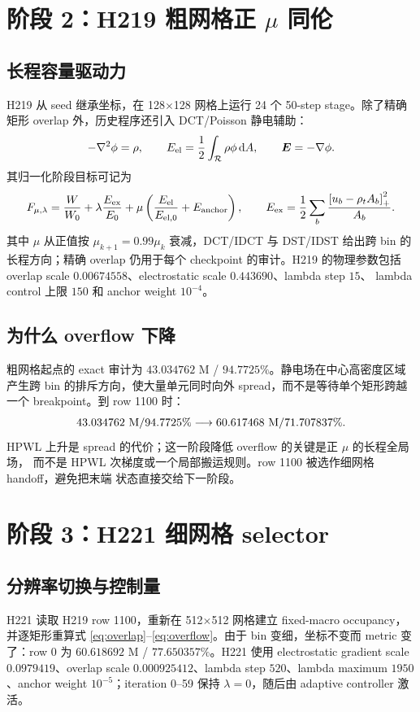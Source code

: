 \documentclass[UTF8,11pt,a4paper]{ctexart}
\newcommand{\R}{\mathcal{R}}
\newcommand{\clip}[1]{\left[#1\right]_+}
\begin{document}
\section{阶段 2：H219 粗网格正 \texorpdfstring{$\mu$}{mu} 同伦}

\subsection{长程容量驱动力}
H219 从 seed 继承坐标，在 128$\times$128 网格上运行 24 个 50-step stage。除了精确
矩形 overlap 外，历史程序还引入 DCT/Poisson 静电辅助：
\begin{equation}
 -\nabla^2\phi=\rho,\qquad
 E_{\rm el}=\frac12\int_{\R}\rho\phi\,\mathrm dA,\qquad
 \bm E=-\nabla\phi.
 \label{eq:electro}
\end{equation}
其归一化阶段目标可记为
\begin{equation}
 F_{\mu,\lambda}=\frac{W}{W_0}
 +\lambda\frac{E_{\rm ex}}{E_0}
 +\mu\left(\frac{E_{\rm el}}{E_{{\rm el},0}}+E_{\rm anchor}\right),
 \qquad
 E_{\rm ex}=\frac12\sum_b\frac{\clip{u_b-\rho_tA_b}^2}{A_b}.
 \label{eq:coarseobjective}
\end{equation}
其中 $\mu$ 从正值按 $\mu_{k+1}=0.99\mu_k$ 衰减，DCT/IDCT 与 DST/IDST 给出跨 bin
的长程方向；精确 overlap 仍用于每个 checkpoint 的审计。H219 的物理参数包括
overlap scale $0.00674558$、electrostatic scale $0.443690$、lambda step $15$、
lambda control 上限 $150$ 和 anchor weight $10^{-4}$。

\subsection{为什么 overflow 下降}
粗网格起点的 exact 审计为 $43.034762$ M / $94.7725\%$。静电场在中心高密度区域
产生跨 bin 的排斥方向，使大量单元同时向外 spread，而不是等待单个矩形跨越一个
breakpoint。到 row 1100 时：
\begin{equation}
 43.034762\ {\rm M}/94.7725\%
 \longrightarrow60.617468\ {\rm M}/71.707837\%.
 \label{eq:coarseresult}
\end{equation}
HPWL 上升是 spread 的代价；这一阶段降低 overflow 的关键是正 $\mu$ 的长程全局场，
而不是 HPWL 次梯度或一个局部搬运规则。row 1100 被选作细网格 handoff，避免把末端
状态直接交给下一阶段。

\section{阶段 3：H221 细网格 selector}

\subsection{分辨率切换与控制量}
H221 读取 H219 row 1100，重新在 512$\times$512 网格建立 fixed-macro occupancy，
并逐矩形重算式 \eqref{eq:overlap}--\eqref{eq:overflow}。由于 bin 变细，坐标不变而
metric 变了：row 0 为 $60.618692$ M / $77.650357\%$。H221 使用
electrostatic gradient scale $0.0979419$、overlap scale $0.000925412$、lambda
step $520$、lambda maximum $1950$、anchor weight $10^{-5}$；iteration 0--59
保持 $\lambda=0$，随后由 adaptive controller 激活。
\end{document}
